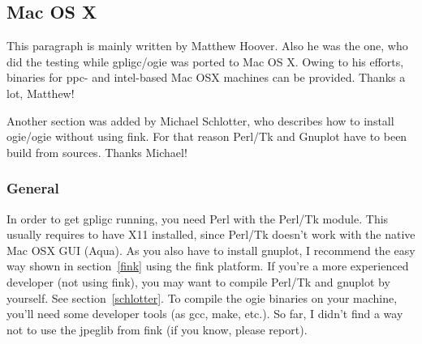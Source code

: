 \subsection{Mac OS X}
\label{mac}
This paragraph is mainly written by Matthew Hoover. Also he was the one, who did the testing while gpligc/ogie was ported to Mac OS X.
Owing to his efforts, binaries for ppc- and intel-based Mac OSX machines can be provided.
Thanks a lot, Matthew!

Another section was added by Michael Schlotter, who describes how to install ogie/ogie without using fink.
For that reason Perl/Tk and Gnuplot have to been build from sources. Thanks Michael!


\subsubsection{General}
In order to get gpligc running, you need Perl with the Perl/Tk module. This usually requires to have X11 installed, since Perl/Tk doesn't work with the native Mac OSX GUI (Aqua).
As you also have to install gnuplot, I recommend the easy way shown in section~\ref{fink} using the fink platform.
If you're a more experienced developer (not using fink), you may want to compile Perl/Tk and gnuplot by yourself.
See section~\ref{schlotter}.
To compile the ogie binaries on your machine, you'll need some developer tools (as gcc, make, etc.).
So far, I didn't find a way not to use the jpeglib from fink (if you know, please report).


